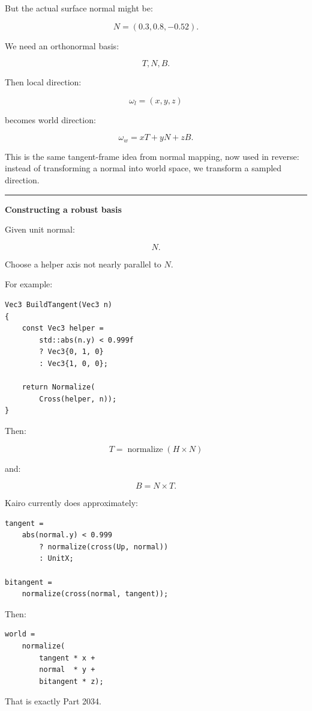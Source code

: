 But the actual surface normal might be:

\[
N=(0.3,0.8,-0.52).
\]

We need an orthonormal basis:

\[
T,
N,
B.
\]

Then local direction:

\[
\omega_l=(x,y,z)
\]

becomes world direction:

\[
\boxed{
\omega_w
=
xT+
yN+
zB.
}
\]

This is the same tangent-frame idea from normal mapping, now used in reverse: instead of transforming a normal into world space, we transform a sampled direction.

\begin{center}\rule{0.5\linewidth}{0.5pt}\end{center}

\textbf{Constructing a robust basis}

Given unit normal:

\[
N.
\]

Choose a helper axis not nearly parallel to \(N\).

For example:

\begin{verbatim}
Vec3 BuildTangent(Vec3 n)
{
    const Vec3 helper =
        std::abs(n.y) < 0.999f
        ? Vec3{0, 1, 0}
        : Vec3{1, 0, 0};

    return Normalize(
        Cross(helper, n));
}
\end{verbatim}

Then:

\[
T=\operatorname{normalize}(H\times N)
\]

and:

\[
B=N\times T.
\]

Kairo currently does approximately:

\begin{verbatim}
tangent =
    abs(normal.y) < 0.999
        ? normalize(cross(Up, normal))
        : UnitX;

bitangent =
    normalize(cross(normal, tangent));
\end{verbatim}

Then:

\begin{verbatim}
world =
    normalize(
        tangent * x +
        normal  * y +
        bitangent * z);
\end{verbatim}

That is exactly Part 2034.

